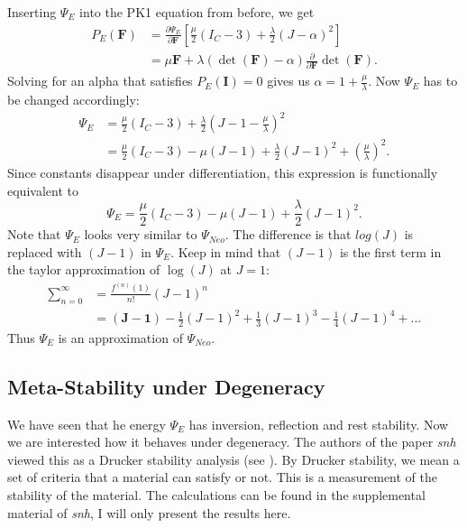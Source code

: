 Inserting $\Psi_E$ into the PK1 equation from before, we get
\begin{align*}
P_{E}(\mathbf{F}) &= \frac{\partial \Psi_{E}}{\partial \mathbf{F}} \left[ \frac{\mu}{2}\left(I_{C}-3\right) +\frac{\lambda}{2}(J-\alpha)^{2} \right] \\
&= \mu \mathbf{F} + \lambda (\operatorname{det}(\mathbf{F})-\alpha)  \frac{\partial}{\partial \mathbf{F}} \operatorname{det}(\mathbf{F}).
\end{align*}
Solving for an alpha that satisfies $P_{E}(\mathbf{I})=0$ gives us $\alpha=1+\frac{\mu}{\lambda}$. Now $\Psi_{E}$ has to be changed accordingly:
\begin{align*}
\Psi_{E} &= \frac{\mu}{2}\left(I_{C}-3\right) +\frac{\lambda}{2}(J-1-\frac{\mu}{\lambda})^{2} \\
&= \frac{\mu}{2}\left(I_{C}-3\right) - \mu\left(J-1\right) + \frac{\lambda}{2}(J-1)^{2} + \left(\frac{\mu}{\lambda}\right)^{2}.
\end{align*}
Since constants disappear under differentiation, this expression is functionally equivalent to 
\[
\Psi_{E} = \frac{\mu}{2}\left(I_{C}-3\right) - \mu\left(J-1\right) + \frac{\lambda}{2}(J-1)^{2}.
\]
Note that $\Psi_{E}$ looks very similar to $\Psi_{Neo}$. The difference is that $log(J)$ is replaced with $(J-1)$ in $\Psi_{E}$. Keep in mind that $(J-1)$ is the first term in the taylor approximation of $\operatorname{log}(J)$ at $J=1$:
\begin{align*}
\sum_{n=0}^{\infty} &= \frac{f^{(n)}(1)}{n!} (J-1)^{n} \\
&= \boldsymbol{(J-1)} - \frac{1}{2} (J-1)^{2} + \frac{1}{3} (J-1)^{3} -\frac{1}{4} (J-1)^{4} + \text{...}
\end{align*}
Thus $\Psi_{E}$ is an approximation of $\Psi_{Neo}$.


\subsection{Meta-Stability under Degeneracy}
We have seen that he energy $\Psi_{E}$ has inversion, reflection and rest stability. Now we are interested how it behaves under degeneracy. The authors of the paper \textit{\acrshort{snh}} viewed this as a Drucker stability analysis (see \cite{bower2009applied}). By Drucker stability, we mean a set of criteria that a material can satisfy or not. This is a measurement of the stability of the material. The calculations can be found in the supplemental material of \textit{\acrshort{snh}}, I will only present the results here. 

